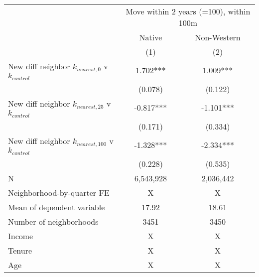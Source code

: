 \begin{tabular}{lcc}
\toprule
 & \multicolumn{2}{c}{Move within 2 years (=100), within 100m} \\ 
\cmidrule(lr){2-3}
 & Native & Non-Western \\ 
\cmidrule(lr){2-2} \cmidrule(lr){3-3}
  & (1) & (2) \\ 
\midrule
New diff neighbor $k_{nearest,0}$ v $k_{control}$ & 1.702*** & 1.009*** \\ 
 & (0.078) & (0.122) \\ 
New diff neighbor $k_{nearest,25}$ v $k_{control}$ & -0.817*** & -1.101*** \\ 
 & (0.171) & (0.334) \\ 
New diff neighbor $k_{nearest,100}$ v $k_{control}$ & -1.328*** & -2.334*** \\ 
 & (0.228) & (0.535) \\ 
\midrule
N & 6,543,928 & 2,036,442 \\ 
Neighborhood-by-quarter FE & X & X \\ 
Mean of dependent variable & 17.92 & 18.61 \\ 
Number of neighborhoods & 3451 & 3450 \\ 
Income & X & X \\ 
Tenure & X & X \\ 
Age & X & X \\ 
\bottomrule
\end{tabular}
